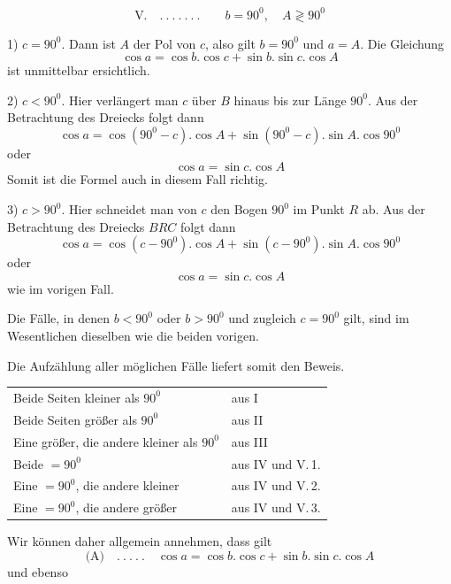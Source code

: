 %
\[
\text{V.}\quad .\ .\ .\ .\ .\ .\ .\qquad b=90^0,\quad A\gtrless90^0
\]
\par
1) \(c=90^0\). Dann ist \(A\) der Pol von \(c\), also gilt \(b=90^0\) und \(a=A\). Die Gleichung
\[
\cos a=\cos b.\cos c+\sin b.\sin c.\cos A
\]
ist unmittelbar ersichtlich.

2) \(c<90^0\). Hier verlängert man \(c\) über \(B\) hinaus bis zur Länge \(90^0\). Aus der Betrachtung des Dreiecks folgt dann
\[
\cos a=\cos(90^0-c).\cos A+\sin(90^0-c).\sin A.\cos90^0
\]
oder
\[
\cos a=\sin c.\cos A
\]
Somit ist die Formel auch in diesem Fall richtig.

3) \(c>90^0\). Hier schneidet man von \(c\) den Bogen \(90^0\) im Punkt \(R\) ab. Aus der Betrachtung des Dreiecks \(BRC\) folgt dann
\[
\cos a=\cos(c-90^0).\cos A+\sin(c-90^0).\sin A.\cos90^0
\]
oder
\[
\cos a=\sin c.\cos A
\]
wie im vorigen Fall.

Die Fälle, in denen \(b<90^0\) oder \(b>90^0\) und zugleich \(c=90^0\) gilt, sind im Wesentlichen dieselben wie die beiden vorigen.

Die Aufzählung aller möglichen Fälle liefert somit den Beweis.
\begin{center}
\begin{tabular}{ll}
Beide Seiten kleiner als \(90^0\)&aus I\\
Beide Seiten größer als \(90^0\)&aus II\\
Eine größer, die andere kleiner als \(90^0\)&aus III\\
Beide \(=90^0\)&aus IV und V.\,1.\\
Eine \(=90^0\), die andere kleiner&aus IV und V.\,2.\\
Eine \(=90^0\), die andere größer&aus IV und V.\,3.\\
\end{tabular}
\end{center}
\hspace*{\parindent}Wir können daher allgemein annehmen, dass gilt
\[
\text{(A)}\quad .\ .\ .\ .\ .\quad\cos a=\cos b.\cos c+\sin b.\sin c.\cos A
\]
und ebenso
